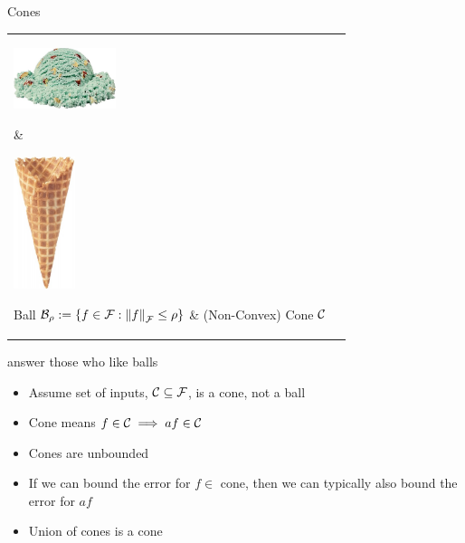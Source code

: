 \documentclass[11pt,compress,xcolor={usenames,dvipsnames},aspectratio=169]{beamer}
\newcommand{\scoop}[1]{\parbox{#1}{\includegraphics[width=#1]{IceCreamScoop.eps}}\xspace}
\newcommand{\largescoop}{\scoop{3cm}}
\newcommand{\ICcone}[1]{\parbox{#1}{\includegraphics[width=#1,angle=270]{MediumWaffleCone.eps}}\xspace}
\newcommand{\largecone}{\ICcone{1.8cm}}
\begin{document}
\begin{frame}{Cones}
\vspace{-4ex}
\begin{tabular}{>{\centering}m{}@{\qquad}>{\centering}m{}}
     \largescoop \hspace{-3cm}\raisebox{-4ex}{\color{red}\fontsize{100}{120}\selectfont $\times$} & 
      \largecone \tabularnewline
      Ball $\cb_{\rho} := \{f \in \cf : \norm[\cf]{f} \le \rho \}$ &
      \hspace{2cm} (Non-Convex) Cone $\cc$
\end{tabular}
answer those who like balls

\begin{itemize}
    \item Assume set of inputs, $\cc \subseteq \cf$, is a \alert{cone}, not a ball
    
    \item \alert{Cone} means $f \in \cc \implies af \in \cc$
    
    \item \alert{Cones} are unbounded
    
    \item If we can bound the error for $f \in $ \alert{cone}, then we can typically also bound the error  for $af$
    
    \item Union of \alert{cones} is a \alert{cone}
\end{itemize}

    
\end{frame}
\end{document}
